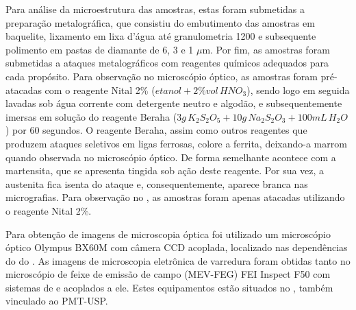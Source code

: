 Para análise da microestrutura das amostras, estas foram submetidas a preparação metalográfica, que consistiu do embutimento das amostras em baquelite, lixamento em lixa d'água até granulometria 1200 e subsequente polimento em pastas de diamante de 6, 3 e 1 $\mu$m. Por fim, as amostras foram submetidas a ataques metalográficos com reagentes químicos adequados para cada propósito. Para observação no microscópio óptico, as amostras foram pré-atacadas com o reagente Nital 2\% ($etanol + 2\%vol\,HNO_3$), sendo logo em seguida lavadas sob água corrente com detergente neutro e algodão, e subsequentemente imersas em solução do reagente Beraha ($3g\,K_2S_2O_5 + 10g\,Na_2S_2O_3 + 100mL\,H_2O$) por 60 segundos. O reagente Beraha, assim como outros reagentes que produzem ataques seletivos em ligas ferrosas, colore a ferrita, deixando-a marrom quando observada no microscópio óptico. De forma semelhante acontece com a martensita, que se apresenta tingida sob ação deste reagente. Por sua vez, a austenita fica isenta do ataque e, consequentemente, aparece branca nas micrografias\cite{MetalsVol9}. Para observação no , as amostras foram apenas atacadas utilizando o reagente Nital 2\%.

Para obtenção de imagens de microscopia óptica foi utilizado um microscópio óptico Olympus BX60M com câmera CCD acoplada, localizado nas dependências do  do . As imagens de microscopia eletrônica de varredura foram obtidas tanto no microscópio de feixe de emissão de campo (MEV-FEG) FEI Inspect F50 com sistemas de  e  acoplados a ele. Estes equipamentos estão situados no , também vinculado ao PMT-USP.


